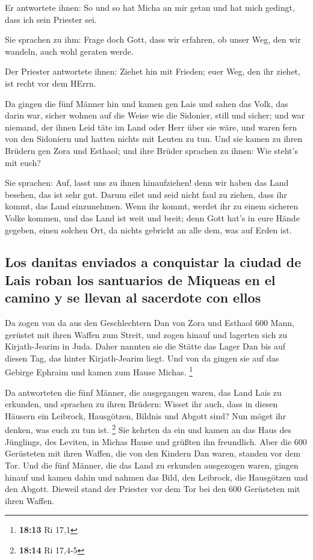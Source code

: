  Er antwortete ihnen: So und so hat Micha an mir getan und
hat mich gedingt, dass ich sein Priester sei.

 Sie sprachen zu ihm: Frage doch Gott, dass wir erfahren,
ob unser Weg, den wir wandeln, auch wohl geraten werde.

 Der Priester antwortete ihnen: Ziehet hin mit Frieden;
euer Weg, den ihr ziehet, ist recht vor dem HErrn.

 Da gingen die fünf Männer hin und kamen gen Lais und
sahen das Volk, das darin war, sicher wohnen auf die Weise wie die
Sidonier, still und sicher; und war niemand, der ihnen Leid täte im Land
oder Herr über sie wäre, und waren fern von den Sidoniern und hatten
nichts mit Leuten zu tun.  Und sie kamen zu ihren Brüdern
gen Zora und Esthaol; und ihre Brüder sprachen zu ihnen: Wie steht's mit
euch?

 Sie sprachen: Auf, lasst uns zu ihnen hinaufziehen! denn
wir haben das Land besehen, das ist sehr gut. Darum eilet und seid nicht
faul zu ziehen, dass ihr kommt, das Land einzunehmen. 
Wenn ihr kommt, werdet ihr zu einem sicheren Volke kommen, und das Land
ist weit und breit; denn Gott hat's in eure Hände gegeben, einen solchen
Ort, da nichts gebricht an alle dem, was auf Erden ist.

\hypertarget{los-danitas-enviados-a-conquistar-la-ciudad-de-lais-roban-los-santuarios-de-miqueas-en-el-camino-y-se-llevan-al-sacerdote-con-ellos}{%
\subsection{Los danitas enviados a conquistar la ciudad de Lais roban
los santuarios de Miqueas en el camino y se llevan al sacerdote con
ellos}\label{los-danitas-enviados-a-conquistar-la-ciudad-de-lais-roban-los-santuarios-de-miqueas-en-el-camino-y-se-llevan-al-sacerdote-con-ellos}}

 Da zogen von da aus den Geschlechtern Dan von Zora und
Esthaol 600 Mann, gerüstet mit ihren Waffen zum Streit, 
und zogen hinauf und lagerten sich zu Kirjath-Jearim in Juda. Daher
nannten sie die Stätte das Lager Dan bis auf diesen Tag, das hinter
Kirjath-Jearim liegt.  Und von da gingen sie auf das
Gebirge Ephraim und kamen zum Hause Michas. \footnote{\textbf{18:13} Ri
  17,1}

 Da antworteten die fünf Männer, die ausgegangen waren,
das Land Lais zu erkunden, und sprachen zu ihren Brüdern: Wisset ihr
auch, dass in diesen Häusern ein Leibrock, Hausgötzen, Bildnis und
Abgott sind? Nun möget ihr denken, was euch zu tun ist. \footnote{\textbf{18:14}
  Ri 17,4-5}  Sie kehrten da ein und kamen an das Haus
des Jünglings, des Leviten, in Michas Hause und grüßten ihn freundlich.
 Aber die 600 Gerüsteten mit ihren Waffen, die von den
Kindern Dan waren, standen vor dem Tor.  Und die fünf
Männer, die das Land zu erkunden ausgezogen waren, gingen hinauf und
kamen dahin und nahmen das Bild, den Leibrock, die Hausgötzen und den
Abgott. Dieweil stand der Priester vor dem Tor bei den 600 Gerüsteten
mit ihren Waffen.

